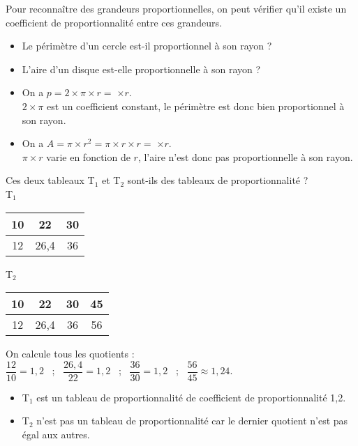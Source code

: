 \begin{methode*2*2}
   Pour reconnaître des grandeurs proportionnelles, on peut vérifier qu'il existe un coefficient de proportionnalité entre ces grandeurs.
   \exercice
      \begin{itemize}
         \item Le périmètre d'un cercle est-il proportionnel à son rayon ?
         \item L'aire d'un disque est-elle proportionnelle à son rayon ?
      \end{itemize}
   \correction
      \begin{itemize}
         \item On a $p =2\times \pi\times r =\;$\fbox{$2\times\pi$}$\times r$. \\
            $2\times\pi$ est un coefficient constant, le périmètre est donc bien proportionnel à son rayon.
         \item On a $A =\pi\times r^2 =\pi\times r\times r =\;$$\times r$. \\
      $\pi\times r$ varie en fonction de $r$, l'aire n'est donc pas proportionnelle à son rayon.
      \end{itemize}
   \exercice
      Ces deux tableaux T$_1$ et T$_2$ sont-ils des tableaux de proportionnalité ? \\ [2mm]
   T$_1$
      {
      \begin{tabular}{|c|c|c|}
         \hline
         10 & 22 & 30 \\
         \hline
         12 & 26,4 & 36 \\
         \hline
      \end{tabular}
      \quad
      T$_2$
      \begin{tabular}{|c|c|c|c|}
         \hline
         10 & 22 & 30 & 45 \\
         \hline
         12 & 26,4 & 36 & 56 \\
         \hline
      \end{tabular}}
   \correction
      On calcule tous les quotients : \\ [2mm]
      $\dfrac{12}{10} =1,2$ \, ; \, $\dfrac{26,4}{22} =1,2$ \, ; \, $\dfrac{36}{30} =1,2$ \, ; \, $\dfrac{56}{45} \approx1,24$. \medskip
      \begin{itemize}
         \item T$_1$ est un tableau de proportionnalité de coefficient de proportionnalité 1,2.
         \item T$_2$ n'est pas un tableau de proportionnalité car le dernier quotient n'est pas égal aux autres.
      \end{itemize}
\end{methode*2*2}


